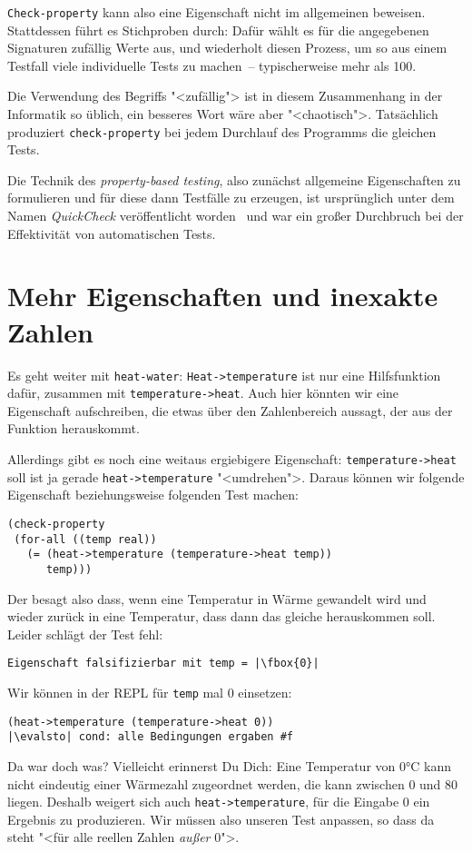 \lstinline{Check-property} kann also eine Eigenschaft nicht im
allgemeinen beweisen.  Stattdessen führt es Stichproben durch: Dafür
wählt es für die angegebenen Signaturen zufällig Werte aus, und
wiederholt diesen Prozess, um so aus einem Testfall viele individuelle
Tests zu machen~-- typischerweise mehr als 100.

Die Verwendung des Begriffs "<zufällig"> ist in diesem Zusammenhang in
der Informatik so üblich, ein besseres Wort wäre aber "<chaotisch">.
Tatsächlich produziert \lstinline{check-property} bei jedem Durchlauf
des Programms die gleichen Tests.

Die Technik des \textit{property-based testing}, also zunächst
allgemeine Eigenschaften zu formulieren und für diese dann Testfälle
zu erzeugen, ist ursprünglich unter dem Namen \textit{QuickCheck}
veröffentlicht worden~\cite{ClaessenHughes2000} und war ein
großer Durchbruch bei der Effektivität von automatischen Tests.

\section{Mehr Eigenschaften und inexakte Zahlen}
\label{sec:inexakt}

Es geht weiter mit \lstinline{heat-water}:
\lstinline{Heat->temperature} ist nur eine Hilfsfunktion dafür,
zusammen mit \lstinline{temperature->heat}.  Auch hier könnten wir
eine Eigenschaft aufschreiben, die etwas über den Zahlenbereich
aussagt, der aus der Funktion herauskommt.

Allerdings gibt es noch eine weitaus ergiebigere Eigenschaft:
\lstinline{temperature->heat} soll ist ja gerade
\lstinline{heat->temperature} "<umdrehen">.  Daraus können wir
folgende Eigenschaft beziehungsweise folgenden Test machen:
%
\begin{lstlisting}
(check-property
 (for-all ((temp real))
   (= (heat->temperature (temperature->heat temp))
      temp)))
\end{lstlisting}
%
Der besagt also dass, wenn eine Temperatur in Wärme gewandelt wird und
wieder zurück in eine Temperatur, dass dann das gleiche herauskommen
soll.  Leider schlägt der Test fehl:
%
\begin{lstlisting}
Eigenschaft falsifizierbar mit temp = |\fbox{0}|
\end{lstlisting}
%
Wir können in der REPL für \lstinline{temp} mal 0 einsetzen:
%
\begin{lstlisting}
(heat->temperature (temperature->heat 0))
|\evalsto| cond: alle Bedingungen ergaben #f
\end{lstlisting}
%
Da war doch was?  Vielleicht erinnerst Du Dich: Eine Temperatur von
0\si{\degree}C kann nicht eindeutig einer Wärmezahl zugeordnet werden,
die kann zwischen 0 und 80 liegen.  Deshalb weigert sich auch
\lstinline{heat->temperature}, für die Eingabe 0 ein Ergebnis zu
produzieren.  Wir müssen also unseren Test anpassen, so dass da steht
"<für alle reellen Zahlen \emph{außer} 0">.

